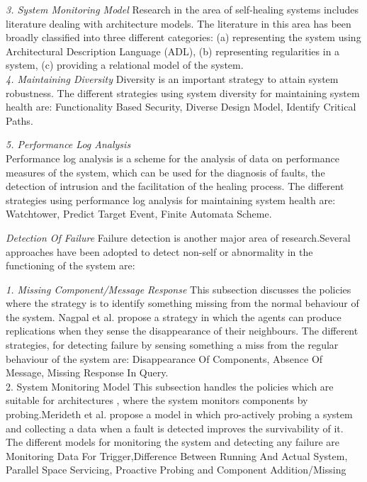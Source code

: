\textit{3. System Monitoring Model}
Research in the area of self-healing systems includes
literature dealing with architecture models. The literature in this area has been broadly classified into three different categories:
(a) representing the system using Architectural Description Language (ADL), 
(b) representing regularities in a system, 
(c) providing a relational model of the system.\\

\textit{4. Maintaining Diversity}
Diversity is an important strategy to attain system robustness. The different strategies using system diversity for maintaining system health are: Functionality Based Security, Diverse Design Model, Identify Critical Paths.

\textit{5. Performance Log Analysis}\\
Performance log analysis is a scheme for the analysis of data on performance measures of the system, which can be used for the diagnosis of faults, the detection of intrusion and the facilitation of the healing process. The different strategies using performance log analysis for maintaining system health are: Watchtower, Predict Target Event, Finite Automata Scheme.

\textit{Detection Of Failure}
Failure detection is another major area of research.Several approaches have been adopted
to detect non-self or abnormality in the functioning of the system are:

\textit{1. Missing Component/Message Response}
This subsection discusses the policies where the strategy is to identify something missing from the normal behaviour of the system. Nagpal et al. propose a strategy in which the agents can produce replications when they sense the disappearance of their neighbours. The different strategies, for detecting failure  by sensing something a miss from the regular behaviour of the system are: Disappearance Of Components, Absence Of Message, Missing Response In Query.\\

2. System Monitoring Model
This subsection handles the policies which are suitable for architectures , where the system monitors components by probing.Merideth et al. propose a model in which pro-actively probing a system and collecting a data when a fault is detected improves the survivability of it. The different models for monitoring the system and detecting any failure are Monitoring Data For Trigger,Difference Between Running And Actual System, Parallel Space Servicing, Proactive Probing and Component Addition/Missing\\


